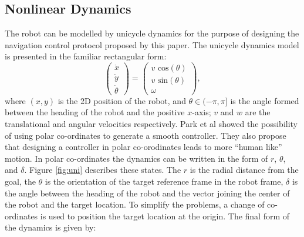 \documentclass[conference]{IEEEtran}
\begin{document}
\subsection{Nonlinear Dynamics}

The robot can be modelled by unicycle dynamics for the purpose of designing the navigation control protocol proposed by this paper. The unicycle dynamics model is presented in the familiar rectangular form:
\begin{equation}
\left(
\begin{matrix}
\dot{x}\\
\dot{y}\\
\dot{\theta}
\end{matrix}
\right)
=
\left(
\begin{matrix}
v \text{ cos}(\theta)\\
v \text{ sin}(\theta)\\
\omega
\end{matrix}
\right),
\end{equation}
where $(x,y)$ is the 2D position of the robot, and $\theta \in (-\pi ,\pi]$ is the angle formed between the heading of the robot and the positive $x$-axis; $v$ and $w$ are the translational and angular velocities respectively. Park et al \cite{park2011} showed the possibility of using polar co-ordinates to generate a smooth controller. They also propose that designing a controller in polar co-orodinates leads to more ``human like'' motion. 
\fi
In polar co-ordinates the dynamics can be written in the form of $r$, $\theta$, and $\delta$. Figure \ref{fig:uni} describes these states. The $r$ is the radial distance from the goal, the $\theta$ is the orientation of the target reference frame in the robot frame, $\delta$ is the angle between the heading of the robot and the vector joining the center of the robot and the target location. To simplify the problems, a change of co-ordinates is used to position the target location at the origin. The final form of the dynamics is given by:  
\end{document}
